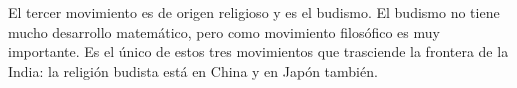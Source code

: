 El tercer movimiento es de origen religioso y es el budismo. El budismo no tiene mucho desarrollo matemático, pero como movimiento filosófico es muy importante. Es el único de estos tres movimientos que trasciende la frontera de la India: la religión budista está en China y en Japón también.